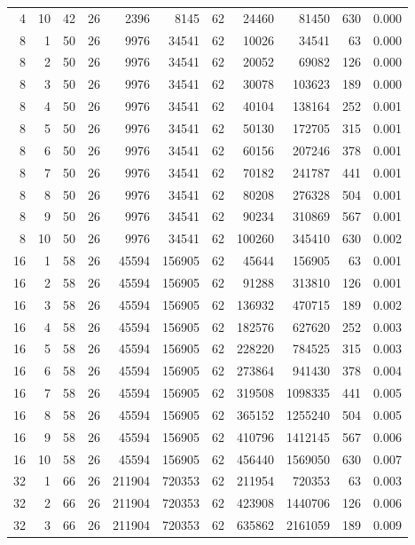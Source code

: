 \begin{table}[t]
\begin{tabularx}{\linewidth}{rrrrrrrrrrr}
4 & 10 & 42 & 26 & 2396 & 8145 & 62 & 24460 & 81450 & 630 & 0.000 \\
8 & 1 & 50 & 26 & 9976 & 34541 & 62 & 10026 & 34541 & 63 & 0.000 \\
8 & 2 & 50 & 26 & 9976 & 34541 & 62 & 20052 & 69082 & 126 & 0.000 \\
8 & 3 & 50 & 26 & 9976 & 34541 & 62 & 30078 & 103623 & 189 & 0.000 \\
8 & 4 & 50 & 26 & 9976 & 34541 & 62 & 40104 & 138164 & 252 & 0.001 \\
8 & 5 & 50 & 26 & 9976 & 34541 & 62 & 50130 & 172705 & 315 & 0.001 \\
8 & 6 & 50 & 26 & 9976 & 34541 & 62 & 60156 & 207246 & 378 & 0.001 \\
8 & 7 & 50 & 26 & 9976 & 34541 & 62 & 70182 & 241787 & 441 & 0.001 \\
8 & 8 & 50 & 26 & 9976 & 34541 & 62 & 80208 & 276328 & 504 & 0.001 \\
8 & 9 & 50 & 26 & 9976 & 34541 & 62 & 90234 & 310869 & 567 & 0.001 \\
8 & 10 & 50 & 26 & 9976 & 34541 & 62 & 100260 & 345410 & 630 & 0.002 \\
16 & 1 & 58 & 26 & 45594 & 156905 & 62 & 45644 & 156905 & 63 & 0.001 \\
16 & 2 & 58 & 26 & 45594 & 156905 & 62 & 91288 & 313810 & 126 & 0.001 \\
16 & 3 & 58 & 26 & 45594 & 156905 & 62 & 136932 & 470715 & 189 & 0.002 \\
16 & 4 & 58 & 26 & 45594 & 156905 & 62 & 182576 & 627620 & 252 & 0.003 \\
16 & 5 & 58 & 26 & 45594 & 156905 & 62 & 228220 & 784525 & 315 & 0.003 \\
16 & 6 & 58 & 26 & 45594 & 156905 & 62 & 273864 & 941430 & 378 & 0.004 \\
16 & 7 & 58 & 26 & 45594 & 156905 & 62 & 319508 & 1098335 & 441 & 0.005 \\
16 & 8 & 58 & 26 & 45594 & 156905 & 62 & 365152 & 1255240 & 504 & 0.005 \\
16 & 9 & 58 & 26 & 45594 & 156905 & 62 & 410796 & 1412145 & 567 & 0.006 \\
16 & 10 & 58 & 26 & 45594 & 156905 & 62 & 456440 & 1569050 & 630 & 0.007 \\
32 & 1 & 66 & 26 & 211904 & 720353 & 62 & 211954 & 720353 & 63 & 0.003 \\
32 & 2 & 66 & 26 & 211904 & 720353 & 62 & 423908 & 1440706 & 126 & 0.006 \\
32 & 3 & 66 & 26 & 211904 & 720353 & 62 & 635862 & 2161059 & 189 & 0.009 \\

\end{tabularx}
\end{table}
